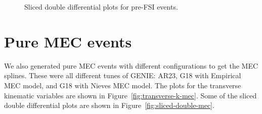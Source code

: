 \documentclass{article}
\begin{document}
\begin{figure}
    \caption{Sliced double differential plots for pre-FSI events.}
    \label{fig:sliced-double-differential-cos-mu-no-fsi}
\end{figure}

\section{Pure MEC events}

We also generated pure MEC events with different configurations to get the MEC splines. These were all different tunes of GENIE: AR23, G18 with Empirical MEC model, and G18 with Nieves MEC model. The plots for the transverse kinematic variables are shown in Figure~\ref{fig:transverse-k-mec}. Some of the sliced double differential plots are shown in Figure~\ref{fig:sliced-double-mec}.
\end{document}
